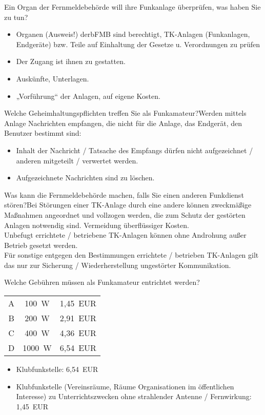 \documentclass[avery5371,grid,frame,a4paper]{flashcards}
\newcommand{\card}[3]{
  \begin{flashcard}[{\chap} -- #1]{#2}#3\end{flashcard}
}
\begin{document}
\card{14}{Ein Organ der Fernmeldebehörde will ihre Funkanlage überprüfen, was haben Sie zu tun?}{\begin{itemize}\itemsep1pt \item Organen (Ausweis!) derbFMB sind berechtigt, TK-Anlagen (Funkanlagen, Endgeräte) bzw. Teile auf Einhaltung der Gesetze u. Verordnungen zu prüfen \item Der Zugang ist ihnen zu gestatten. \item Auskünfte, Unterlagen. \item			„Vorführung“ der Anlagen, auf eigene Kosten. \end{itemize}}

\card{14}{ Welche Geheimhaltungspflichten treffen Sie als Funkamateur?}{Werden mittels Anlage Nachrichten empfangen, die nicht für die Anlage, das Endgerät, den Benutzer bestimmt sind:\begin{itemize}\itemsep1pt \item Inhalt der Nachricht / Tatsache des Empfangs dürfen nicht aufgezeichnet / anderen mitgeteilt / verwertet	werden. \item Aufgezeichnete Nachrichten sind zu löschen.\end{itemize}}

\card{16}{Was kann die Fernmeldebehörde machen, falls Sie einen anderen Funkdienst stören?}{Bei Störungen einer TK-Anlage durch eine andere können zweckmäßige Maßnahmen angeordnet und vollzogen werden, die zum Schutz der gestörten	Anlagen notwendig sind. Vermeidung überflüssiger Kosten. \\ Unbefugt errichtete / betriebene TK-Anlagen können ohne Androhung außer Betrieb gesetzt werden. \\ Für sonstige entgegen den Bestimmungen errichtete / betrieben TK-Anlagen gilt das nur zur Sicherung / Wiederherstellung ungestörter Kommunikation.}

\card{17}{Welche Gebühren müssen als Funkamateur entrichtet werden?}{
  \begin{tabular}{ccc}
    A & 100~W & 1,45~EUR \\
    B & 200~W & 2,91~EUR \\
    C & 400~W & 4,36~EUR \\
    D & 1000~W & 6,54~EUR
  \end{tabular}
  \begin{itemize}
    \item Klubfunkstelle: 6,54~EUR
    \item Klubfunkstelle (Vereinsräume, Räume Organisationen im öffentlichen Interesse) zu Unterrichtszwecken ohne strahlender Antenne / Fernwirkung: 1,45~EUR
  \end{itemize}
}
\end{document}
